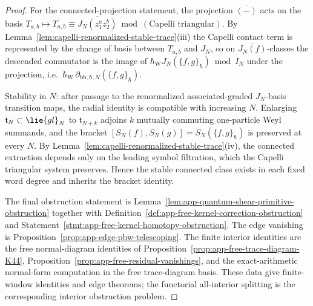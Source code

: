 \documentclass[11pt]{memoir}
\begin{document}
\begin{proof}
  For the connected-projection statement, the projection
  $\overline{(-)}$ acts on the basis
  $T_{a,b}\mapsto\overline{T_{a,b}}\equiv
   \overline{J_N(z_1^az_2^b)}\bmod(\text{Capelli triangular})$.
  By Lemma~\ref{lem:capelli-renormalized-stable-trace}(iii) the Capelli
  contact term is represented by the change of basis between $T_{a,b}$ and
  $J_N$, so on $\overline{J_N(f)}$-classes the descended commutator is
  the image of \(\hbar_{\mathrm{W}} J_N(\{f,g\}_\hbar)\bmod I_N\) under the projection,
  i.e.\ \(\hbar_{\mathrm{W}}\,\partial_{\mathrm{bb},\hbar,N}(\{f,g\}_\hbar)\).

  Stability in $N$: after passage to the renormalized associated-graded
  \(J_N\)-basis transition maps, the radial identity is compatible with
  increasing \(N\). Enlarging
  $\mathfrak t_N\subset\lie{gl}_N$ to $\mathfrak t_{N+k}$ adjoins $k$
  mutually commuting one-particle Weyl summands, and the bracket
  $[S_N(f),S_N(g)]=S_N(\{f,g\}_\hbar)$ is preserved at every $N$. By
  Lemma~\ref{lem:capelli-renormalized-stable-trace}(iv), the connected
  extraction depends only on the leading symbol filtration, which the
  Capelli triangular system preserves. Hence the stable connected class
  exists in each fixed word degree and inherits the bracket identity.

  The final obstruction statement is
  Lemma~\ref{lem:app-quantum-shear-primitive-obstruction} together with
  Definition~\ref{def:app-free-kernel-correction-obstruction} and
  Statement~\ref{stmt:app-free-kernel-homotopy-obstruction}.  The edge
  vanishing is Proposition~\ref{prop:app-edge-pbw-telescoping}.  The
  finite interior identities are the free normal-diagram identities of
  Proposition~\ref{prop:app-free-trace-diagram-K44},
  Proposition~\ref{prop:app-free-residual-vanishings}, and the
  exact-arithmetic normal-form computation in the free trace-diagram
  basis.
  These data give finite-window identities and edge theorems; the
  functorial all-interior splitting is the corresponding interior
  obstruction problem.
\end{proof}
\end{document}
